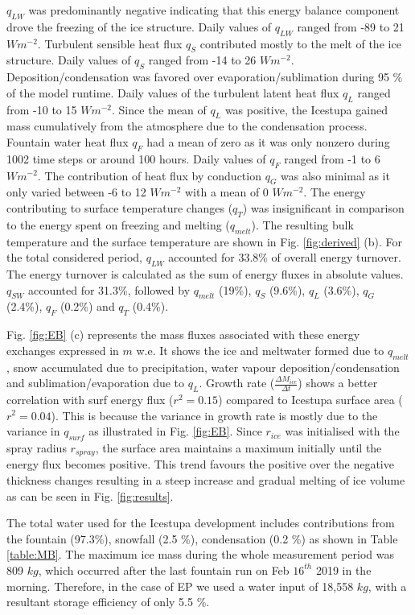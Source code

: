 \documentclass[utf8]{frontiersSCNS} %
\begin{document}
$q_{LW}$ was predominantly negative indicating that this energy balance component drove the freezing of the ice
structure. Daily values of $q_{LW}$ ranged from -89 to 21 $Wm^{-2}$.  Turbulent sensible heat flux $q_{S}$ contributed
mostly to the melt of the ice structure. Daily values of $q_{S}$ ranged from -14 to 26 $Wm^{-2}$.
Deposition/condensation was favored over evaporation/sublimation during 95 \% of the model runtime.  Daily values of the
turbulent latent heat flux $q_{L}$ ranged from -10 to 15 $Wm^{-2}$.  Since the mean of $q_{L}$ was positive, the
Icestupa gained mass cumulatively from the atmosphere due to the condensation process.  Fountain water heat flux $q_{F}$
had a mean of zero as it was only nonzero during 1002 time steps or around 100 hours.  Daily values of $q_{F}$ ranged
from -1 to 6 $Wm^{-2}$. The contribution of heat flux by conduction $q_{G}$ was also minimal as it only varied between
-6 to 12 $Wm^{-2}$ with a mean of 0 $Wm^{-2}$. The energy contributing to surface temperature changes ($q_{T}$) was
insignificant in comparison to the energy spent on freezing and melting ($q_{melt}$).  The resulting bulk temperature
and the surface temperature are shown in Fig. \ref{fig:derived} (b).  For the total considered period, $q_{LW}$
accounted for 33.8\% of overall energy turnover. The energy turnover is calculated as the sum of energy fluxes in
absolute values. $q_{SW}$ accounted for 31.3\%, followed by $q_{melt}$ (19\%), $q_{S}$ (9.6\%), $q_{L}$ (3.6\%), $q_{G}$
(2.4\%), $q_{F}$ (0.2\%) and $q_{T}$ (0.4\%).

Fig. \ref{fig:EB} (c) represents the mass fluxes associated with these energy exchanges expressed in $m$ w.e. It shows
the ice and meltwater formed due to $q_{melt}$, snow accumulated due to precipitation, water vapour
deposition/condensation and sublimation/evaporation due to $q_L$. Growth rate ($\frac{\Delta M_{ice}}{\Delta t}$)
shows a better correlation with surf energy flux ($r^2 = 0.15$) compared to Icestupa surface area ($r^2 =
0.04$).  This is because the variance in growth rate is mostly due to the variance in $q_{surf}$ as illustrated in Fig.
\ref{fig:EB}. Since $r_{ice}$ was initialised with the spray radius $r_{spray}$, the surface area maintains a maximum
initially until the energy flux becomes positive. This trend favours the positive over the negative thickness changes
resulting in a steep increase and gradual melting of ice volume as can be seen in Fig. \ref{fig:results}.

The total water used for the Icestupa development includes contributions from the fountain (97.3\%), snowfall (2.5 \%),
condensation (0.2 \%) as shown in Table \ref{table:MB}. The maximum ice mass during the whole
measurement period was 809 $kg$, which occurred after the last fountain run on Feb $16^{th}$ 2019 in the morning.
Therefore, in the case of EP we used a water input of 18,558 $kg$, with a resultant storage efficiency of only 5.5 \%.
\end{document}
